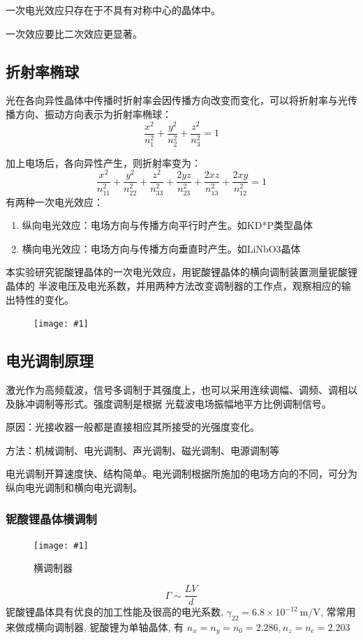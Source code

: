 \documentclass[UTF8]{ctexart}
\newcommand{\singlefig}[4]{
	\begin{figure}[!h]
		\centering
		\texttt{[image: \#1]}
		\caption{#2}
		\label{#3}
	\end{figure}
}
\begin{document}
一次电光效应只存在于不具有对称中心的晶体中。

一次效应要比二次效应更显著。

\subsection{折射率椭球}

光在各向异性晶体中传播时折射率会因传播方向改变而变化，可以将折射率与光传播方向、振动方向表示为折射率椭球：
\begin{equation}
	\frac{x^{2}}{n_{1}^{2}}+\frac{y^{2}}{n_{2}^{2}}+\frac{z^{2}}{n_{3}^{2}}=1
\end{equation}

加上电场后，各向异性产生，则折射率变为：
\begin{equation}
	\frac{x^{2}}{n_{11}^{2}}+\frac{y^{2}}{n_{22}^{2}}+\frac{z^{2}}{n_{33}^{2}}+\frac{2 y z}{n_{23}^{2}}+\frac{2 x z}{n_{13}^{2}}+\frac{2 x y}{n_{12}^{2}}=1
\end{equation}
有两种一次电光效应：
\begin{enumerate}
	\item 纵向电光效应：电场方向与传播方向平行时产生。如KD*P类型晶体
	\item 横向电光效应：电场方向与传播方向垂直时产生。如LiNbO3晶体
\end{enumerate}
本实验研究铌酸锂晶体的一次电光效应，用铌酸锂晶体的横向调制装置测量铌酸锂晶体的
半波电压及电光系数，并用两种方法改变调制器的工作点，观察相应的输出特性的变化。

\singlefig{1}{}{}{0.8}
\subsection{电光调制原理}
激光作为高频载波，信号多调制于其强度上，也可以采用连续调幅、调频、调相以及脉冲调制等形式。强度调制是根据
光载波电场振幅地平方比例调制信号。

原因：光接收器一般都是直接相应其所接受的光强度变化。

方法：机械调制、电光调制、声光调制、磁光调制、电源调制等

电光调制开算速度快、结构简单。电光调制根据所施加的电场方向的不同，可分为纵向电光调制和横向电光调制。
\subsubsection{铌酸锂晶体横调制}
\singlefig{2}{横调制器}{tzq}{0.6}
\begin{equation}
	\Gamma \sim \frac{LV}{d}
\end{equation}
铌酸锂晶体具有优良的加工性能及很高的电光系数, 
$\gamma_{22}=6.8 \times 10^{-12} \mathrm{~m} / \mathrm{V}$, 
常常用来做成横向调制器, 铌酸锂为单轴晶体, 有 $n_{x}=n_{y}=n_{0}=2.286, n_{z}=n_{e}=2.203$
\end{document}
